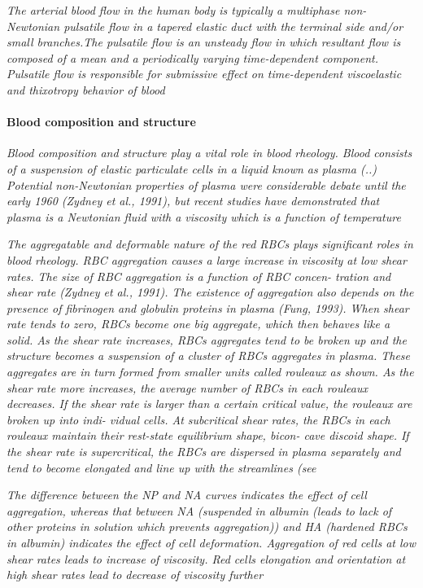 \documentclass[11pt,letterpaper]{article}
\begin{document}
\textit{The  arterial blood flow in  the human body is typically  a
multiphase non-Newtonian pulsatile flow in a  tapered elastic duct with the terminal side and/or small  branches.The pulsatile flow is an unsteady  flow  in which resultant flow is  composed  of  a mean and  a periodically varying time-dependent component. Pulsatile flow  is responsible  for submissive effect  on  time-dependent viscoelastic and thixotropy behavior of  blood}


\paragraph{Blood composition and  structure}\textit{Blood composition  and structure play a vital role in blood  rheology. Blood consists of a suspension of  elastic particulate cells  in  a liquid known as plasma (..) Potential non-Newtonian properties of plasma  were considerable debate until the early 1960 (Zydney  et al., 1991), but  recent  studies have demonstrated  that plasma is  a Newtonian  fluid with  a viscosity which is a  function of temperature}

\textit{The aggregatable and  deformable nature of the red RBCs
plays significant roles in blood rheology. RBC aggregation causes a large increase in  viscosity at low shear rates. The size of RBC aggregation is a  function  of  RBC  concen- tration and shear rate (Zydney  et al., 1991).  The existence of aggregation also depends  on  the presence of fibrinogen and  globulin proteins in plasma (Fung,  1993). When  shear rate tends to  zero,  RBCs become  one big aggregate,  which then  behaves like  a solid. As  the shear  rate increases, RBCs aggregates  tend to be  broken  up and the  structure becomes a suspension of a  cluster of  RBCs aggregates in  plasma. These aggregates are  in turn formed  from smaller  units called rouleaux as shown. As the shear rate more  increases,  the average number of  RBCs  in each rouleaux  decreases. If the shear rate is larger than a certain  critical value,  the rouleaux are  broken up  into indi- vidual cells. At subcritical shear rates, the  RBCs  in each rouleaux maintain  their rest-state equilibrium  shape, bicon- cave discoid shape.  If the  shear rate is  supercritical, the RBCs  are dispersed in plasma separately  and tend to become  elongated  and line up with the streamlines  (see}

\textit{The  difference between the NP and NA curves indicates the effect of  cell aggregation, whereas that  between NA (suspended in albumin (leads to lack of other proteins in solution which prevents aggregation))  and HA (hardened RBCs in albumin) indicates the  effect of cell deformation. Aggregation of  red cells at low shear rates leads to  increase  of viscosity. Red cells  elongation and orientation  at high shear rates  lead to decrease of viscosity further}
\end{document}
